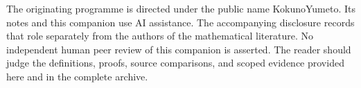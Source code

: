 The originating programme is directed under the public name KokunoYumeto.
Its notes and this companion use AI assistance. The accompanying disclosure
records that role separately from the authors of the mathematical literature.
No independent human peer review of this companion is asserted. The reader
should judge the definitions, proofs, source comparisons, and scoped evidence
provided here and in the complete archive.

